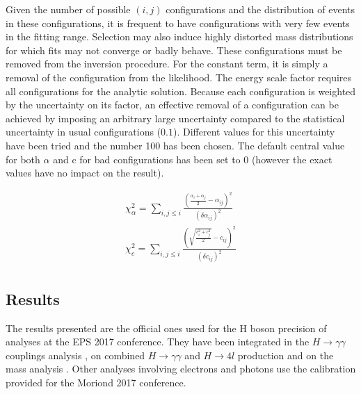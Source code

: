 Given the number of possible $(i,j)$ configurations and the distribution of events in these configurations, it is frequent to have configurations with very few events in the fitting range.
Selection may also induce highly distorted mass distributions for which fits may not converge or badly behave.
These configurations must be removed from the inversion procedure.
For the constant term, it is simply a removal of the configuration from the likelihood.
The energy scale factor requires all configurations for the analytic solution.
Because each configuration is weighted by the uncertainty on its factor, an effective removal of a configuration can be achieved by imposing an arbitrary large uncertainty compared to the statistical uncertainty in  usual configurations ($0.1$).
Different values for this uncertainty have been tried and the number 100 has been chosen.
The default central value for both \(\alpha\) and c for bad configurations has been set to 0 (however the exact  values have no impact on the result).

\begin{equation}
\label{eq:orgc99789a}
\begin{array}{l}
  \chi_\alpha^2 = \sum \limits_{i, j\leq i} \frac{ (\frac{\alpha_i + \alpha_j}{2} - \alpha_{ij})^2 }{(\delta \alpha_{ij})^2}\\
  \chi_c^2 = \sum \limits_{i, j\leq i} \frac{ (\sqrt{\frac{c_i^2 + c_j^2}{2}} - c_{ij})^2 }{(\delta c_{ij})^2}\\
\end{array}
\end{equation}


\subsection{Results}
\label{sec:orge2330e7}

The results presented are the official ones used for the H boson precision of analyses at the EPS 2017 conference.
They have been integrated in the \(H\rightarrow\gamma\gamma\) couplings analysis \cite{ATLAS-CONF-2017-045}, on combined \(H\rightarrow\gamma\gamma\) and \(H\rightarrow 4l\) production \cite{ATLAS-COM-CONF-2017-054} and on the mass analysis \cite{ATLAS-CONF-2017-046}.
Other analyses involving electrons and photons use the calibration provided for the Moriond 2017 conference.


